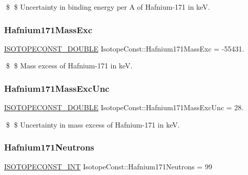 \$ \$ Uncertainty in binding energy per A of Hafnium-\/171 in keV. \mbox{\label{group___isotope_const-_hafnium-_hf171_ga5f35943e6816cd87eac44a0c134f7cbc}} 
\subsubsection{\texorpdfstring{Hafnium171\+Mass\+Exc}{Hafnium171MassExc}}
{\footnotesize\ttfamily \mbox{\hyperlink{group___isotope_const-_macros_ga8f45a7272ce02c0b4c65c44636ed719a}{I\+S\+O\+T\+O\+P\+E\+C\+O\+N\+S\+T\+\_\+\+D\+O\+U\+B\+LE}} Isotope\+Const\+::\+Hafnium171\+Mass\+Exc = -\/55431.}

\$ \$ Mass excess of Hafnium-\/171 in keV. \mbox{\label{group___isotope_const-_hafnium-_hf171_ga3ed70235209a20e40ed355a9120d72f7}} 
\subsubsection{\texorpdfstring{Hafnium171\+Mass\+Exc\+Unc}{Hafnium171MassExcUnc}}
{\footnotesize\ttfamily \mbox{\hyperlink{group___isotope_const-_macros_ga8f45a7272ce02c0b4c65c44636ed719a}{I\+S\+O\+T\+O\+P\+E\+C\+O\+N\+S\+T\+\_\+\+D\+O\+U\+B\+LE}} Isotope\+Const\+::\+Hafnium171\+Mass\+Exc\+Unc = 28.}

\$ \$ Uncertainty in mass excess of Hafnium-\/171 in keV. \mbox{\label{group___isotope_const-_hafnium-_hf171_ga86afa37580e6890993d80f4768ebb418}} 
\subsubsection{\texorpdfstring{Hafnium171\+Neutrons}{Hafnium171Neutrons}}
{\footnotesize\ttfamily \mbox{\hyperlink{group___isotope_const-_macros_ga5f18360b3e99483a35c32d789e62621c}{I\+S\+O\+T\+O\+P\+E\+C\+O\+N\+S\+T\+\_\+\+I\+NT}} Isotope\+Const\+::\+Hafnium171\+Neutrons = 99}

